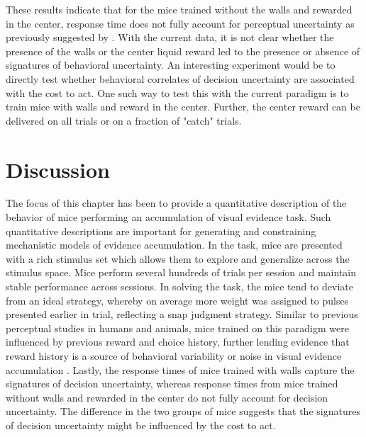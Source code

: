 These results indicate that for the mice trained without the walls and rewarded in the center, response time does not fully account for perceptual uncertainty as previously suggested by \textcite{Sanders2016}. With the current data, it is not clear whether the presence of the walls or the center liquid reward led to the presence or absence of signatures of behavioral uncertainty. An interesting experiment would be to directly test whether behavioral correlates of decision uncertainty are associated with the cost to act. One such way to test this with the current paradigm is to train mice with walls and reward in the center. Further, the center reward can be delivered on all trials or on a fraction of "catch" trials. \par 

\section{Discussion}
The focus of this chapter has been to provide a quantitative description of the behavior of mice performing an accumulation of visual evidence task. Such quantitative descriptions are important for generating and constraining mechanistic models of evidence accumulation. In the task, mice are presented with a rich stimulus set which allows them to explore and generalize across the stimulus space. Mice perform several hundreds of trials per session and maintain stable performance across sessions. In solving the task, the mice tend to deviate from an ideal strategy, whereby on average more weight was assigned to pulses presented earlier in trial, reflecting a snap judgment strategy. Similar to previous perceptual studies in humans and animals, mice trained on this paradigm were influenced by previous reward and choice history, further lending evidence that reward history is a source of behavioral variability or noise in visual evidence accumulation \parencite{Scott2015SourcesRats}. Lastly, the response times of mice trained with walls capture the signatures of decision uncertainty, whereas response times from mice trained without walls and rewarded in the center do not fully account for decision uncertainty. The difference in the two groups of mice suggests that the signatures of decision uncertainty might be influenced by the cost to act. 



